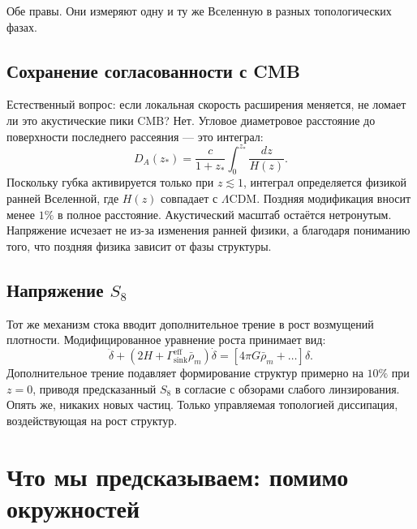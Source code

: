 \documentclass[12pt,a4paper]{report}
\begin{document}
Обе правы. Они измеряют одну и ту же Вселенную в разных топологических фазах.

\section{Сохранение согласованности с CMB}
Естественный вопрос: если локальная скорость расширения меняется, не ломает ли это акустические пики CMB? Нет. Угловое диаметровое расстояние до поверхности последнего рассеяния — это интеграл:
$$
D_A(z_*) = \frac{c}{1+z_*} \int_0^{z_*} \frac{dz}{H(z)}.
$$
Поскольку губка активируется только при $z \lesssim 1$, интеграл определяется физикой ранней Вселенной, где $H(z)$ совпадает с $\Lambda$CDM. Поздняя модификация вносит менее $1\%$ в полное расстояние. Акустический масштаб остаётся нетронутым. Напряжение исчезает не из-за изменения ранней физики, а благодаря пониманию того, что поздняя физика зависит от фазы структуры.

\section{Напряжение $S_8$}
Тот же механизм стока вводит дополнительное трение в рост возмущений плотности. Модифицированное уравнение роста принимает вид:
$$
\ddot{\delta} + (2H + \Gamma_{\mathrm{sink}}^{\mathrm{eff}}\bar{\rho}_m)\dot{\delta} = [4\pi G\bar{\rho}_m + \dots]\delta.
$$
Дополнительное трение подавляет формирование структур примерно на $10\%$ при $z=0$, приводя предсказанный $S_8$ в согласие с обзорами слабого линзирования. Опять же, никаких новых частиц. Только управляемая топологией диссипация, воздействующая на рост структур.



\chapter{Что мы предсказываем: помимо окружностей}
\end{document}
